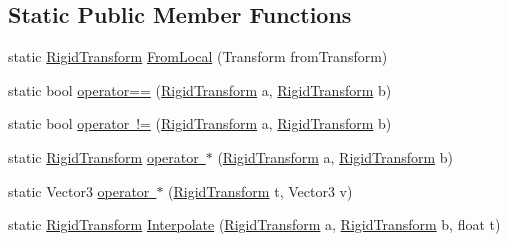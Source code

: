 \subsection*{Static Public Member Functions}
\begin{DoxyCompactItemize}
\item 
static \mbox{\hyperlink{struct_valve_1_1_v_r_1_1_steam_v_r___utils_1_1_rigid_transform}{Rigid\+Transform}} \mbox{\hyperlink{struct_valve_1_1_v_r_1_1_steam_v_r___utils_1_1_rigid_transform_ab8c9c2c5f4c3317704b4969475099d53}{From\+Local}} (Transform from\+Transform)
\item 
static bool \mbox{\hyperlink{struct_valve_1_1_v_r_1_1_steam_v_r___utils_1_1_rigid_transform_a80039f648bd317d1834312fcfdf05bf7}{operator==}} (\mbox{\hyperlink{struct_valve_1_1_v_r_1_1_steam_v_r___utils_1_1_rigid_transform}{Rigid\+Transform}} a, \mbox{\hyperlink{struct_valve_1_1_v_r_1_1_steam_v_r___utils_1_1_rigid_transform}{Rigid\+Transform}} b)
\item 
static bool \mbox{\hyperlink{struct_valve_1_1_v_r_1_1_steam_v_r___utils_1_1_rigid_transform_a44fa2a41bcc6cbcb0bb24fbe124dde02}{operator !=}} (\mbox{\hyperlink{struct_valve_1_1_v_r_1_1_steam_v_r___utils_1_1_rigid_transform}{Rigid\+Transform}} a, \mbox{\hyperlink{struct_valve_1_1_v_r_1_1_steam_v_r___utils_1_1_rigid_transform}{Rigid\+Transform}} b)
\item 
static \mbox{\hyperlink{struct_valve_1_1_v_r_1_1_steam_v_r___utils_1_1_rigid_transform}{Rigid\+Transform}} \mbox{\hyperlink{struct_valve_1_1_v_r_1_1_steam_v_r___utils_1_1_rigid_transform_af46cff34764cf27ee72c5d0c8412f321}{operator $\ast$}} (\mbox{\hyperlink{struct_valve_1_1_v_r_1_1_steam_v_r___utils_1_1_rigid_transform}{Rigid\+Transform}} a, \mbox{\hyperlink{struct_valve_1_1_v_r_1_1_steam_v_r___utils_1_1_rigid_transform}{Rigid\+Transform}} b)
\item 
static Vector3 \mbox{\hyperlink{struct_valve_1_1_v_r_1_1_steam_v_r___utils_1_1_rigid_transform_ab1bec4ee6ae6e7efe88a659f82760b93}{operator $\ast$}} (\mbox{\hyperlink{struct_valve_1_1_v_r_1_1_steam_v_r___utils_1_1_rigid_transform}{Rigid\+Transform}} t, Vector3 v)
\item 
static \mbox{\hyperlink{struct_valve_1_1_v_r_1_1_steam_v_r___utils_1_1_rigid_transform}{Rigid\+Transform}} \mbox{\hyperlink{struct_valve_1_1_v_r_1_1_steam_v_r___utils_1_1_rigid_transform_a28850c000b7c770cc2a1ef635b089873}{Interpolate}} (\mbox{\hyperlink{struct_valve_1_1_v_r_1_1_steam_v_r___utils_1_1_rigid_transform}{Rigid\+Transform}} a, \mbox{\hyperlink{struct_valve_1_1_v_r_1_1_steam_v_r___utils_1_1_rigid_transform}{Rigid\+Transform}} b, float t)
\end{DoxyCompactItemize}
